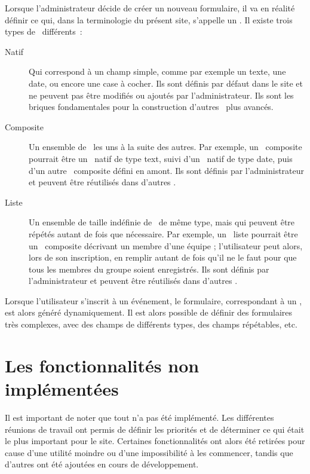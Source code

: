 Lorsque l'administrateur décide de créer un nouveau formulaire, il va en réalité définir ce qui, dans la terminologie du présent site, s'appelle un \formwidget. Il existe trois types de \formwidget\ différents~:
\begin{description}
    \item[Natif] Qui correspond à un champ simple, comme par exemple un texte, une date, ou encore une case à cocher. Ils sont définis par défaut dans le site et ne peuvent pas être modifiés ou ajoutés par l'administrateur. Ils sont les briques fondamentales pour la construction d'autres \formwidget\ plus avancés.
    \item[Composite] Un ensemble de \formwidget\ les uns à la suite des autres. Par exemple, un \formwidget\ composite pourrait être un \formwidget\ natif de type text, suivi d'un \formwidget\ natif de type date, puis d'un autre \formwidget\ composite défini en amont. Ils sont définis par l'administrateur et peuvent être réutilisés dans d'autres \formwidget.
    \item[Liste] Un ensemble de taille indéfinie de \formwidget\ de même type, mais qui peuvent être répétés autant de fois que nécessaire. Par exemple, un \formwidget\ liste pourrait être un \formwidget\ composite décrivant un membre d'une équipe ; l'utilisateur peut alors, lors de son inscription, en remplir autant de fois qu'il ne le faut pour que tous les membres du groupe soient enregistrés. Ils sont définis par l'administrateur et peuvent être réutilisés dans d'autres \formwidget.
\end{description}

Lorsque l'utilisateur s'inscrit à un événement, le formulaire, correspondant à un \formwidget, est alors généré dynamiquement. Il est alors possible de définir des formulaires très complexes, avec des champs de différents types, des champs répétables, etc.

\section{Les fonctionnalités non implémentées}
\label{sec:non-implem}

Il est important de noter que tout n'a pas été implémenté. Les différentes réunions de travail ont permis de définir les priorités et de déterminer ce qui était le plus important pour le site. Certaines fonctionnalités ont alors été retirées pour cause d'une utilité moindre ou d'une impossibilité à les commencer, tandis que d'autres ont été ajoutées en cours de développement.
\bigskip

